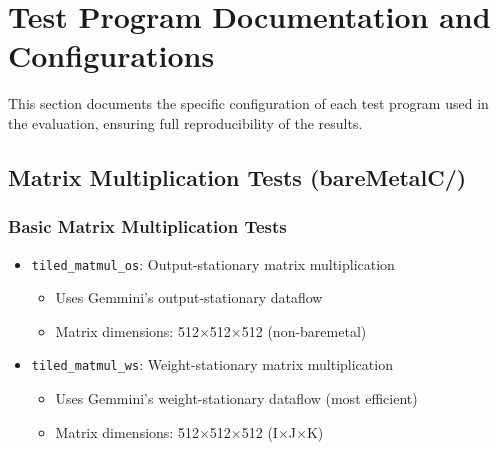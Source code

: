 \section{Test Program Documentation and Configurations}

This section documents the specific configuration of each test program used in the evaluation, ensuring full reproducibility of the results.

\subsection{Matrix Multiplication Tests (bareMetalC/)}

\subsubsection{Basic Matrix Multiplication Tests}
\begin{itemize}
\item \texttt{tiled\_matmul\_os}: Output-stationary matrix multiplication
  \begin{itemize}
  \item Uses Gemmini's output-stationary dataflow
  \item Matrix dimensions: 512$\times$512$\times$512 (non-baremetal)
  \end{itemize}

\item \texttt{tiled\_matmul\_ws}: Weight-stationary matrix multiplication
  \begin{itemize}
  \item Uses Gemmini's weight-stationary dataflow (most efficient)
  \item Matrix dimensions: 512$\times$512$\times$512 (I$\times$J$\times$K)
  \end{itemize}
\end{itemize}

